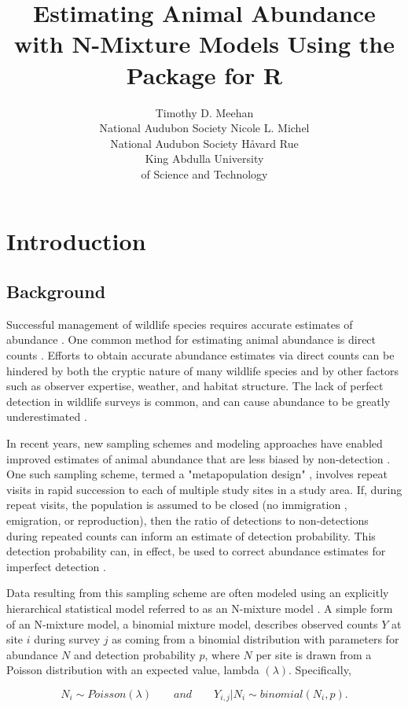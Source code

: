 \documentclass[article]{jss}
\author{Timothy D. Meehan\\National Audubon Society \And
        Nicole L. Michel\\National Audubon Society \And
        H{\aa}vard Rue\\King Abdulla University\\of Science and Technology}
\title{Estimating Animal Abundance with N-Mixture Models Using the \pkg{R-INLA} Package for R}
\begin{document}
\section[Introduction]{Introduction}
\subsection[Background]{Background}
Successful management of wildlife species requires accurate estimates of abundance \citep{Yoccoz_Nichols_Boulinier_2001}.  One common method for estimating animal abundance is direct counts \citep{Pollock_Nichols_Simons_Farnsworth_Bailey_Sauer_2002}.  Efforts to obtain accurate abundance estimates via direct counts can be hindered by both the cryptic nature of many wildlife species and by other factors such as observer expertise, weather, and habitat structure.  The lack of perfect detection in wildlife surveys is common, and can cause abundance to be greatly underestimated \citep{Wenger_Freeman_2008, Joseph_Elkin_Martin_Possingham_2009}.

In recent years, new sampling schemes and modeling approaches have enabled improved estimates of animal abundance that are less biased by non-detection \citep{Denes_Silveira_Beissinger_2015}.  One such sampling scheme, termed a "metapopulation design" \citep{Kery_Royle_2010}, involves repeat visits in rapid succession to each of multiple study sites in a study area.  If, during repeat visits, the population is assumed to be closed (no immigration , emigration, or reproduction), then the ratio of detections to non-detections during repeated counts can inform an estimate of detection probability.  This detection probability can, in effect, be used to correct abundance estimates for imperfect detection \citep{Denes_Silveira_Beissinger_2015}.

Data resulting from this sampling scheme are often modeled using an explicitly hierarchical statistical model referred to as an N-mixture model \citep{Royle_Nichols_2003, Dodd_Dorazio_2004, Royle_2004, Kery_Royle_Schmid_2005}.  A simple form of an N-mixture model, a binomial mixture model, describes observed counts $Y$ at site $i$ during survey $j$ as coming from a binomial distribution with parameters for abundance $N$ and detection probability $p$, where $N$ per site is drawn from a Poisson distribution with an expected value, lambda $(\lambda)$. Specifically,

$$N_i \sim Poisson(\lambda) \qquad and \qquad  Y_{i,j} | N_i \sim binomial(N_i, p).$$
\end{document}
